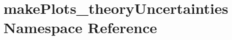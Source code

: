 \hypertarget{namespacemakePlots__theoryUncertainties}{
\section{makePlots\_\-theoryUncertainties Namespace Reference}
\label{namespacemakePlots__theoryUncertainties}
}
